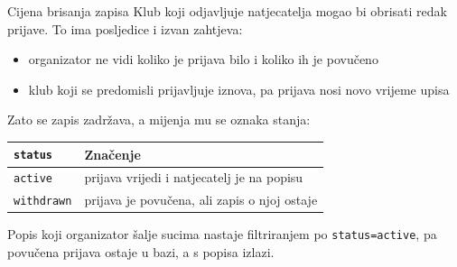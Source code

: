 
\begin{frame}{Cijena brisanja zapisa}
Klub koji odjavljuje natjecatelja mogao bi obrisati redak prijave. To ima posljedice i izvan zahtjeva:

\begin{itemize}
  \itemsep0.35em
  \item organizator ne vidi koliko je prijava bilo i koliko ih je povučeno
  \item klub koji se predomisli prijavljuje iznova, pa prijava nosi novo vrijeme upisa
\end{itemize}

\vspace{0.5em}
Zato se zapis zadržava, a mijenja mu se oznaka stanja:

\vspace{0.3em}
\begin{center}
{\small
\setlength{\tabcolsep}{0pt}
\renewcommand{\arraystretch}{1.35}
\begin{tabular}{@{}L{3.4cm}L{7.6cm}@{}}
  \toprule
  \textbf{\texttt{status}} & \textbf{Značenje} \\
  \midrule
  \texttt{active}    & prijava vrijedi i natjecatelj je na popisu \\
  \texttt{withdrawn} & prijava je povučena, ali zapis o njoj ostaje \\
  \bottomrule
\end{tabular}
}
\end{center}

\vspace{0.4em}
Popis koji organizator šalje sucima nastaje filtriranjem po \texttt{status=active}, pa povučena prijava ostaje u bazi, a s popisa izlazi.
\end{frame}

